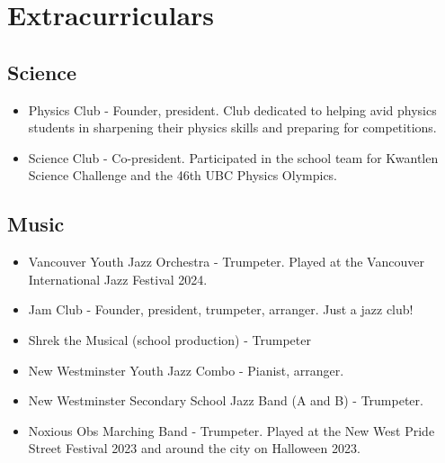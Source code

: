 \documentclass{article}
\begin{document}
\section*{Extracurriculars}

\subsection*{Science}

\begin{itemize}
    \item Physics Club - Founder, president. Club dedicated to helping avid physics students in sharpening their physics skills and preparing for competitions.
    \item Science Club - Co-president. Participated in the school team for Kwantlen Science Challenge and the 46th UBC Physics Olympics.
\end{itemize}

\subsection*{Music}

\begin{itemize}
    \item Vancouver Youth Jazz Orchestra - Trumpeter. Played at the Vancouver International Jazz Festival 2024.
    \item Jam Club - Founder, president, trumpeter, arranger. Just a jazz club!
    \item Shrek the Musical (school production) - Trumpeter
    \item New Westminster Youth Jazz Combo - Pianist, arranger.
    \item New Westminster Secondary School Jazz Band (A and B) - Trumpeter.
    \item Noxious Obs Marching Band - Trumpeter. Played at the New West Pride Street Festival 2023 and around the city on Halloween 2023.
\end{itemize}
\end{document}
